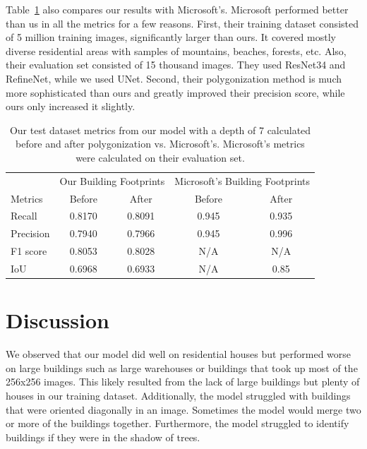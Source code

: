 \documentclass[acmtog, authorversion]{acmart}
\begin{document}
Table~\ref{tab:obfvsmbf} also compares our results with Microsoft’s. Microsoft performed better than us in all the metrics for a few reasons. First, their training dataset consisted of 5 million training images\cite{Microsoft2019}, significantly larger than ours. It covered mostly diverse residential areas with samples of mountains, beaches, forests, etc\cite{Microsoft2019}. Also, their evaluation set consisted of 15 thousand images\cite{Microsoft2019}. They used ResNet34 and RefineNet\cite{Microsoft2019}, while we used UNet. Second, their polygonization method is much more sophisticated than ours and greatly improved their precision score, while ours only increased it slightly.

\begin{table}[]
    \caption{Our test dataset metrics from our model with a depth of 7 calculated before and after polygonization vs. Microsoft’s. Microsoft’s metrics were calculated on their evaluation set.}
    \label{tab:obfvsmbf}
    \begin{tabular}{l|cc|cc}
        \toprule
         & \multicolumn{2}{p{2.6cm}|}{Our Building Footprints}
         & \multicolumn{2}{p{2.6cm}}{Microsoft's Building Footprints}\\
        Metrics & Before & After & Before & After\\
        \midrule
        Recall & 0.8170 & 0.8091 & 0.945 & 0.935\\
        Precision & 0.7940 & 0.7966 & 0.945 & 0.996\\
        F1 score & 0.8053 & 0.8028 & N/A & N/A\\
        IoU & 0.6968 & 0.6933 & N/A & 0.85\\
        \bottomrule
    \end{tabular}
\end{table}

\section{Discussion}
We observed that our model did well on residential houses but performed worse on large buildings such as large warehouses or buildings that took up most of the 256x256 images. This likely resulted from the lack of large buildings but plenty of houses in our training dataset. Additionally, the model struggled with buildings that were oriented diagonally in an image. Sometimes the model would merge two or more of the buildings together. Furthermore, the model struggled to identify buildings if they were in the shadow of trees.
\end{document}
